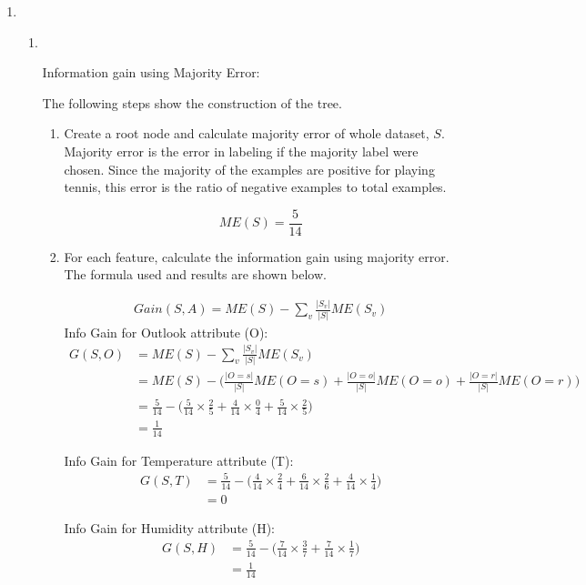 \documentclass[12pt, fullpage,letterpaper]{article}
\begin{document}
\begin{enumerate}
\begin{enumerate}
\end{enumerate}


\item~
\label{sec:q2}
\begin{enumerate}
\item~

	Information gain using Majority Error:
	
	The following steps show the construction of the tree.
	
	\begin{enumerate}
		\item Create a root node and calculate majority error of whole dataset, $S$. Majority error is the error in labeling if the majority label were chosen. Since the majority of the examples are positive for playing tennis, this error is the ratio of negative examples to total examples.
		
			\[
        		ME(S) = \frac{5}{14}
			\]
		
		\item For each feature, calculate the information gain using majority error. The formula used and results are shown below.
		
			\[
        		\begin{split}
        			Gain(S,A) = ME(S) - \sum_v \frac{|S_v|}{|S|} ME(S_v)
        		\end{split}
			\]
			Info Gain for Outlook attribute (O):
			\[
        		\begin{split}
        			G(S,O) &= ME(S) - \sum_v \frac{|S_v|}{|S|} ME(S_v)
        					\\
        					&= ME(S) - \Big( \frac{|O=s|}{|S|} ME(O=s) +  \frac{|O=o|}{|S|} ME(O=o) + \frac{|O=r|}{|S|} ME(O=r)\Big)
        					\\
        					&= \frac{5}{14} - \Big( \frac{5}{14}\times\frac{2}{5} + \frac{4}{14}\times \frac{0}{4} + \frac{5}{14} \times \frac{2}{5}\Big)
        					\\
        					&= \frac{1}{14}
        		\end{split}
			\]
			
			Info Gain for Temperature attribute (T):
			\[
        		\begin{split}
        			G(S,T) &= \frac{5}{14} - \Big( \frac{4}{14}\times\frac{2}{4} + \frac{6}{14}\times \frac{2}{6} + \frac{4}{14} \times \frac{1}{4}\Big)
        					\\
        					&= 0
        		\end{split}
			\]
			
			Info Gain for Humidity attribute (H):
			\[
        		\begin{split}
        			G(S,H) &= \frac{5}{14} - \Big( \frac{7}{14}\times\frac{3}{7} + \frac{7}{14}\times \frac{1}{7} \Big)
        					\\
        					&= \frac{1}{14}
        		\end{split}
			\]
			

\end{enumerate}
\end{enumerate}
\end{enumerate}
\end{document}

